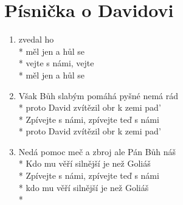 \section{Písnička o Davidovi}
\begin{enumerate}
\item {} zvedal     ho  \\*
 měl jen  a hůl  se  \\*
vejte s námi, vejte   \\*
 měl jen  a hůl  se  
\item Však Bůh slabým pomáhá pyšné nemá rád \\*
proto David zvítězil obr k zemi pad' \\*
Zpívejte s námi, zpívejte teď s námi \\*
proto David zvítězil obr k zemi pad' 
\item Nedá pomoc meč a zbroj ale Pán Bůh náš \\*
Kdo mu věří silnější je než Goliáš \\*
Zpívejte s námi, zpívejte teď s námi \\*
kdo mu věří silnější je než Goliáš \\*
\end{enumerate}
